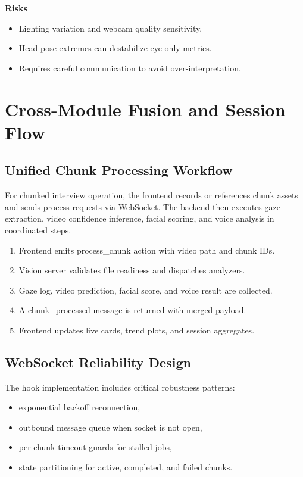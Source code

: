 \documentclass[12pt,a4paper]{report}
\begin{document}
\textbf{Risks}
\begin{itemize}[leftmargin=1.5em]
\item Lighting variation and webcam quality sensitivity.
\item Head pose extremes can destabilize eye-only metrics.
\item Requires careful communication to avoid over-interpretation.
\end{itemize}

\chapter{Cross-Module Fusion and Session Flow}
\section{Unified Chunk Processing Workflow}
For chunked interview operation, the frontend records or references chunk assets and sends process requests via WebSocket. The backend then executes gaze extraction, video confidence inference, facial scoring, and voice analysis in coordinated steps.

\begin{enumerate}[leftmargin=1.5em]
\item Frontend emits process\_chunk action with video path and chunk IDs.
\item Vision server validates file readiness and dispatches analyzers.
\item Gaze log, video prediction, facial score, and voice result are collected.
\item A chunk\_processed message is returned with merged payload.
\item Frontend updates live cards, trend plots, and session aggregates.
\end{enumerate}

\section{WebSocket Reliability Design}
The hook implementation includes critical robustness patterns:
\begin{itemize}[leftmargin=1.5em]
\item exponential backoff reconnection,
\item outbound message queue when socket is not open,
\item per-chunk timeout guards for stalled jobs,
\item state partitioning for active, completed, and failed chunks.
\end{itemize}
\end{document}
